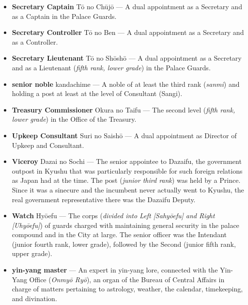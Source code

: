 \documentclass{article}
\begin{document}
\begin{multicols}{2}
\begin{small}
\begin{itemize}[
				label=,
				leftmargin=0em,
				rightmargin=-1.5em,
				itemindent=-2em,
			]
			\item \textbf{Secretary Captain} Tō no Chūjō --- A dual appointment as a Secretary and as a Captain in the Palace Guards.

			\item \textbf{Secretary Controller} Tō no Ben --- A dual appointment as a Secretary and as a Controller.

			\item \textbf{Secretary Lieutenant} Tō no Shōshō --- A dual appointment as a Secretary and as a Lieutenant (\textit{fifth rank, lower grade}) in the Palace Guards.

			\item \textbf{senior noble} kandachime --- A noble of at least the third rank (\textit{sanmi}) and holding a post at least at the level of Consultant (Sangi).

			\item \textbf{Treasury Commissioner} Okura no Taifu --- The second level (\textit{fifth rank, lower grade}) in the Office of the Treasury.

			\item \textbf{Upkeep Consultant} Suri no Saishō --- A dual appointment as Director of Upkeep and Consultant.

			\item \textbf{Viceroy} Dazai no Sochi --- The senior appointee to Dazaifu, the government outpost in Kyushu that was particularly responsible for such foreign relations as Japan had at the time. The post (\textit{junior third rank}) was held by a Prince. Since it was a sinecure and the incumbent never actually went to Kyushu, the real government representative there was the Dazaifu Deputy.

			\item \textbf{Watch} Hyōefu --- The corps (\textit{divided into Left [Sahyōefu] and Right [Uhyōefu]}) of guards charged with maintaining general security in the palace compound and in the City at large. The senior officer was the Intendant (junior fourth rank, lower grade), followed by the Second (junior fifth rank, upper grade).

			\item \textbf{yin-yang master}  --- An expert in yin-yang lore, connected with the Yin-Yang Office (\textit{Onmyō Ryō}), an organ of the Bureau of Central Affairs in charge of matters pertaining to astrology, weather, the calendar, timekeeping, and divination.

		\end{itemize}

	\end{small}

\end{multicols}
\end{document}
